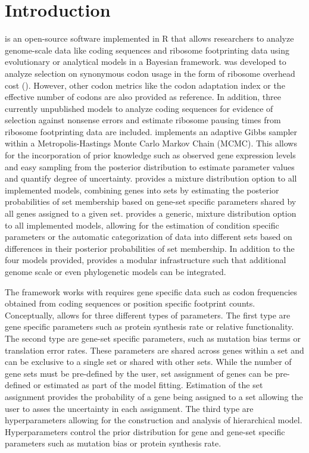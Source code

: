 \newpage

\section{Introduction}

\package is  an open-source software implemented in R \citep{rcore} that allows researchers to analyze genome-scale data like coding sequences and ribosome footprinting data using evolutionary or analytical models in a Bayesian framework. 
\package was developed to analyze selection on synonymous codon usage in the form of ribosome overhead cost (\citep{gilchrist2015,wallace2013,shah2011}).
However, other codon metrics like the codon adaptation index \citep{sharp1987} or the effective number of codons \citep{Wright1990} are also provided as reference.
In addition, three currently unpublished models to analyze coding sequences for evidence of selection against nonsense errors and estimate ribosome pausing times from ribosome footprinting data are included.
\package implements an adaptive Gibbs sampler within a Metropolis-Hastings Monte Carlo Markov Chain (MCMC). 
This allows for the incorporation of prior knowledge such as observed gene expression levels and easy sampling from the posterior distribution to estimate parameter values and quantify degree of uncertainty.
\package provides a mixture distribution option to all implemented models, combining genes into sets by estimating the posterior probabilities of set membership based on gene-set specific parameters shared by all genes assigned to a given set. 
\package provides a generic, mixture distribution option to all implemented models, allowing for the estimation of condition specific parameters or the automatic categorization of data into different sets based on differences in their posterior probabilities of set membership.
In addition to the four models provided, \package provides a modular infrastructure such that additional genome scale or even phylogenetic models can be integrated.

The \package framework works with \package requires gene specific data such as codon frequencies obtained from coding sequences or position specific footprint counts.
Conceptually, \package allows for three different types of parameters.
The first type are gene specific parameters such as protein synthesis rate or relative functionality.
The second type are gene-set specific parameters, such as mutation bias terms or translation error rates.
These parameters are shared across genes within a set and can be exclusive to a single set or shared with other sets.
While the number of gene sets must be pre-defined by the user, set assignment of genes can be pre-defined or estimated as part of the model fitting.
Estimation of the set assignment provides the probability of a gene being assigned to a set allowing the user to asses the uncertainty in each assignment.
The third type are hyperparameters allowing for the construction and analysis of hierarchical model. Hyperparameters control the prior distribution for gene and gene-set specific parameters such as mutation bias or protein synthesis rate.

